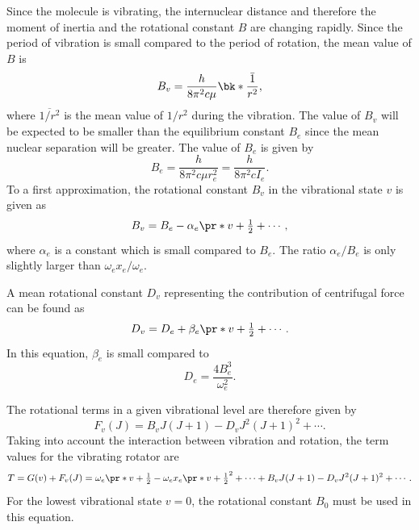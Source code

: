 \documentclass[11pt, twoside, fleqn]{report}
\begin{document}
Since the molecule is vibrating, the internuclear distance and therefore the moment of inertia and the rotational constant $B$ are changing rapidly. Since the period of vibration is small compared to the period of rotation, the mean value of $B$ is
\begin{equation*}
    B_v = \frac{h}{8\pi^2c\mu}\bk*{\bar{\frac{1}{r^2}}},
\end{equation*}
where $\overline{1/r^2}$ is the mean value of $1/r^2$ during the vibration. The value of $B_v$ will be expected to be smaller than the equilibrium constant $B_e$ since the mean nuclear separation will be greater. The value of $B_e$ is given by
\begin{equation*}
    B_e = \frac{h}{8\pi^2c\mu{}r_e^2} = \frac{h}{8\pi^2cI_e}.
\end{equation*}
To a first approximation, the rotational constant $B_v$ in the vibrational state $v$ is given as
\begin{equation*}
    B_v = B_e - \alpha_e\pr*{v + \tfrac{1}{2}} + \dotsb,
\end{equation*}
where $\alpha_e$ is a constant which is small compared to $B_e$. The ratio $\alpha_e/B_e$ is only slightly larger than $\omega_ex_e/\omega_e$.

A mean rotational constant $D_v$ representing the contribution of centrifugal force can be found as
\begin{equation*}
    D_v = D_e + \beta_e\pr*{v + \tfrac{1}{2}} + \dotsb.
\end{equation*}
In this equation, $\beta_e$ is small compared to
\begin{equation*}
    D_e = \frac{4B_e^3}{\omega_e^2}.
\end{equation*}

The rotational terms in a given vibrational level are therefore given by
\begin{equation*}
    F_v(J) = B_vJ(J + 1) - D_vJ^2(J + 1)^2 + \dotsb.
\end{equation*}
Taking into account the interaction between vibration and rotation, the term values for the vibrating rotator are
\begin{equation*}
    T = G(v) + F_v(J) = \omega_e\pr*{v + \tfrac{1}{2}} - \omega_ex_e\pr*{v + \tfrac{1}{2}}^2 + \dotsb + B_vJ(J + 1) - D_vJ^2(J + 1)^2 + \dotsb.
\end{equation*}
For the lowest vibrational state $v = 0$, the rotational constant $B_0$ must be used in this equation.
\end{document}
